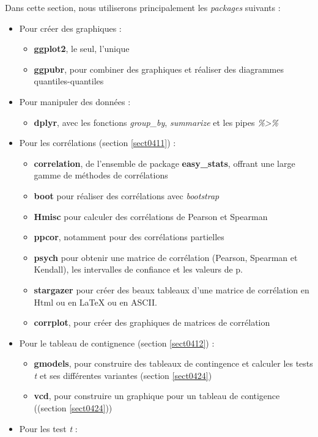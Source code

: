 \documentclass[
  11pt,
  french,
]{book}
\makeatletter
\providecommand{\tightlist}{%
  \setlength{\itemsep}{0pt}\setlength{\parskip}{0pt}}
\newenvironment{kframev}{%
\medskip{}
\setlength{\fboxsep}{.8em}
 \def\at@end@of@kframev{}%
 \ifinner\ifhmode%
  \def\at@end@of@kframev{\end{minipage}}%
  \begin{minipage}{\columnwidth}%
 \fi\fi%
 \def\FrameCommand##1{\hskip\@totalleftmargin \hskip-\fboxsep
 \colorbox{shadebluecolor}{##1}\hskip-\fboxsep
     \hskip-\linewidth \hskip-\@totalleftmargin \hskip\columnwidth}%
 \MakeFramed {\advance\hsize-\width
   \@totalleftmargin\z@ \linewidth\hsize
   \@setminipage}}%
 {\par\unskip\endMakeFramed%
 \at@end@of@kframev}
\newenvironment{rmdblock}[1]
  {
  \begin{itemize}
  \renewcommand{\labelitemi}{
    \raisebox{-.7\height}[0pt][0pt]{
      {\setkeys{Gin}{width=3em,keepaspectratio}\texttt{[image: images/\#1]}}
    }
  }
  \setlength{\fboxsep}{1em}
  \begin{kframev}
  \small
  \item
  }
  {
  \end{kframev}
  \end{itemize}
  }
\newenvironment{bloc_package}
  {\begin{rmdblock}{package}}
  {\end{rmdblock}}
\makeatother
\begin{document}
\begin{bloc_package}

Dans cette section, nous utiliserons principalement les \emph{packages} suivants :

\begin{itemize}
\tightlist
\item
  Pour créer des graphiques :

  \begin{itemize}
  \tightlist
  \item
    \textbf{ggplot2}, le seul, l'unique
  \item
    \textbf{ggpubr}, pour combiner des graphiques et réaliser des diagrammes quantiles-quantiles
  \end{itemize}
\item
  Pour manipuler des données :

  \begin{itemize}
  \tightlist
  \item
    \textbf{dplyr}, avec les fonctions \emph{group\_by}, \emph{summarize} et les pipes \emph{\%\textgreater\%}
  \end{itemize}
\item
  Pour les corrélations (section \ref{sect0411}) :

  \begin{itemize}
  \tightlist
  \item
    \textbf{correlation}, de l'ensemble de package \textbf{easy\_stats}, offrant une large gamme de méthodes de corrélations
  \item
    \textbf{boot} pour réaliser des corrélations avec \emph{bootstrap}
  \item
    \textbf{Hmisc} pour calculer des corrélations de Pearson et Spearman
  \item
    \textbf{ppcor}, notamment pour des corrélations partielles
  \item
    \textbf{psych} pour obtenir une matrice de corrélation (Pearson, Spearman et Kendall), les intervalles de confiance et les valeurs de p.
  \item
    \textbf{stargazer} pour créer des beaux tableaux d'une matrice de corrélation en Html ou en LaTeX ou en ASCII.
  \item
    \textbf{corrplot}, pour créer des graphiques de matrices de corrélation
  \end{itemize}
\item
  Pour le tableau de contignence (section \ref{sect0412}) :

  \begin{itemize}
  \tightlist
  \item
    \textbf{gmodels}, pour construire des tableaux de contingence et calculer les tests \emph{t} et ses différentes variantes (section \ref{sect0424})
  \item
    \textbf{vcd}, pour construire un graphique pour un tableau de contigence ((section \ref{sect0424}))
  \end{itemize}
\item
  Pour les test \emph{t} :


\end{itemize}
\end{bloc_package}
\end{document}

